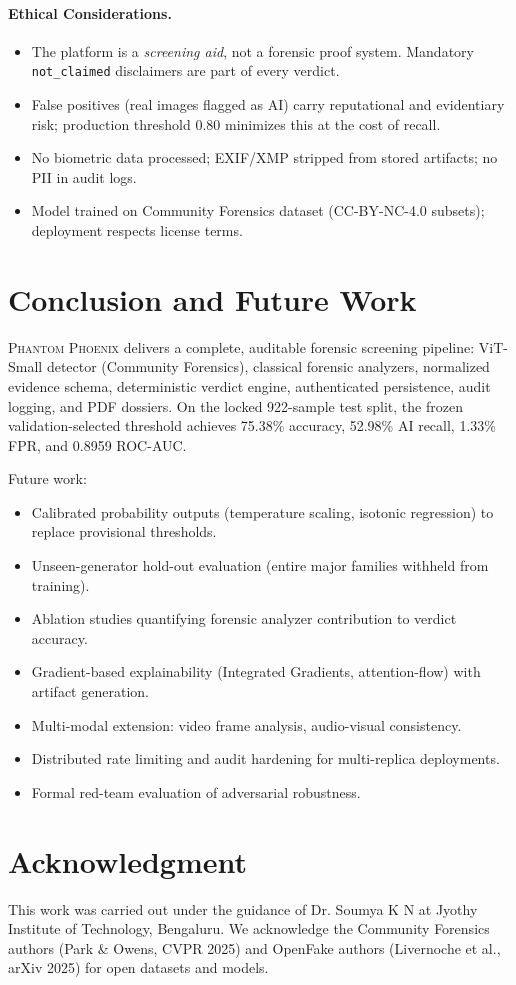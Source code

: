\documentclass[10pt,conference,compsoc]{IEEEtran}
\begin{document}
\paragraph{Ethical Considerations.}
\begin{itemize}
  \item The platform is a \emph{screening aid}, not a forensic proof system. Mandatory \texttt{not\_claimed} disclaimers are part of every verdict.
  \item False positives (real images flagged as AI) carry reputational and evidentiary risk; production threshold 0.80 minimizes this at the cost of recall.
  \item No biometric data processed; EXIF/XMP stripped from stored artifacts; no PII in audit logs.
  \item Model trained on Community Forensics dataset (CC-BY-NC-4.0 subsets); deployment respects license terms.
\end{itemize}

\section{Conclusion and Future Work}
\label{sec:conclusion}

\textsc{Phantom Phoenix} delivers a complete, auditable forensic screening pipeline: ViT-Small detector (Community Forensics), classical forensic analyzers, normalized evidence schema, deterministic verdict engine, authenticated persistence, audit logging, and PDF dossiers.
On the locked 922-sample test split, the frozen validation-selected threshold achieves 75.38\% accuracy, 52.98\% AI recall, 1.33\% FPR, and 0.8959 ROC-AUC.

Future work:
\begin{itemize}
  \item Calibrated probability outputs (temperature scaling, isotonic regression) to replace provisional thresholds.
  \item Unseen-generator hold-out evaluation (entire major families withheld from training).
  \item Ablation studies quantifying forensic analyzer contribution to verdict accuracy.
  \item Gradient-based explainability (Integrated Gradients, attention-flow) with artifact generation.
  \item Multi-modal extension: video frame analysis, audio-visual consistency.
  \item Distributed rate limiting and audit hardening for multi-replica deployments.
  \item Formal red-team evaluation of adversarial robustness.
\end{itemize}

\section*{Acknowledgment}
This work was carried out under the guidance of Dr. Soumya K N at Jyothy Institute of Technology, Bengaluru.
We acknowledge the Community Forensics authors (Park \& Owens, CVPR 2025) and OpenFake authors (Livernoche et al., arXiv 2025) for open datasets and models.



\end{document}
